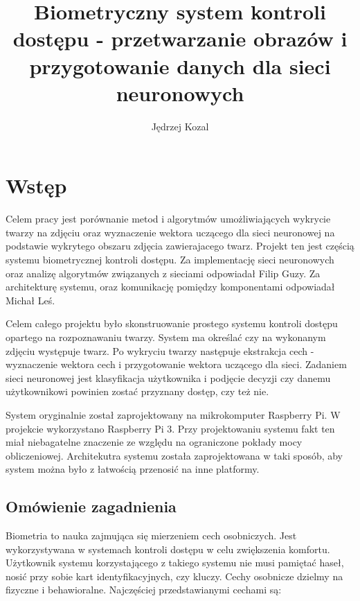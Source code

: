 \documentclass[oneside, eng]{mgr}
\title{Biometryczny system kontroli dostępu - przetwarzanie obrazów i przygotowanie danych dla sieci neuronowych}
\author{Jędrzej Kozal}
\begin{document}


\maketitle

\linespread{1.5}

\chapter{Wstęp}
	Celem pracy jest porównanie metod i algorytmów umożliwiających wykrycie twarzy na zdjęciu oraz wyznaczenie wektora uczącego dla sieci neuronowej na podstawie wykrytego obszaru zdjęcia zawierajacego twarz. Projekt ten jest częścią systemu biometrycznej kontroli dostępu. Za implementację sieci neuronowych oraz analizę algorytmów związanych z sieciami odpowiadał Filip Guzy. Za architekturę systemu, oraz komunikację pomiędzy komponentami odpowiadał Michał Leś. 

Celem całego projektu było skonstruowanie prostego systemu kontroli dostępu opartego na rozpoznawaniu twarzy. System ma określać czy na wykonanym zdjęciu występuje twarz. Po wykryciu twarzy następuje ekstrakcja cech - wyznaczenie wektora cech i przygotowanie wektora uczącego dla sieci. Zadaniem sieci neuronowej jest klasyfikacja użytkownika i podjęcie decyzji czy danemu użytkownikowi powinien zostać przyznany dostęp, czy też nie.

System oryginalnie został zaprojektowany na mikrokomputer Raspberry Pi. W projekcie wykorzystano Raspberry Pi 3. Przy projektowaniu systemu fakt ten miał niebagatelne znaczenie ze względu na ograniczone pokłady mocy obliczeniowej. Architekutra systemu została zaprojektowana w taki sposób, aby system można było z łatwością przenosić na inne platformy. 


\section{Omówienie zagadnienia}

Biometria to nauka zajmująca się mierzeniem cech osobniczych. Jest wykorzystywana w systemach kontroli dostępu w celu zwiększenia komfortu. Użytkownik systemu korzystającego z takiego systemu nie musi pamiętać haseł, nosić przy sobie kart identyfikacyjnych, czy kluczy. Cechy osobnicze dzielmy na fizyczne i behawioralne. Najczęściej przedstawianymi cechami są:
\end{document}
